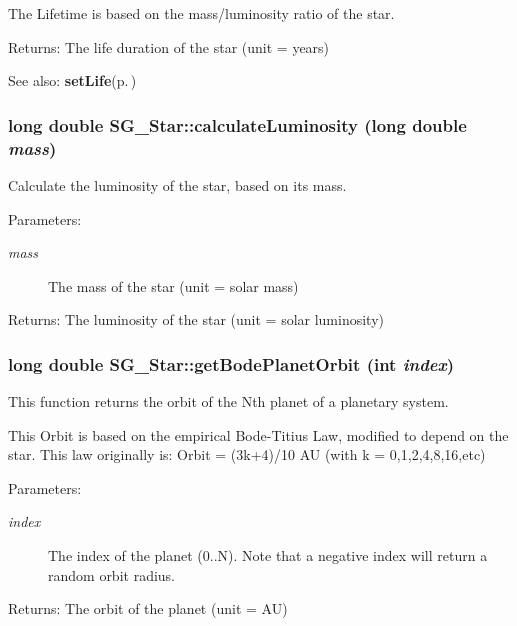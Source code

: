 The Lifetime is based on the mass/luminosity ratio of the star. \begin{Desc}
\item[Returns:]The life duration of the star (unit = years) \end{Desc}
\begin{Desc}
\item[See also:]{\bf set\-Life}{\rm (p.\,\pageref{class_s_g___star_a6})} \end{Desc}
\subsubsection{\setlength{\rightskip}{0pt plus 5cm}long double SG\_\-Star::calculate\-Luminosity (long double {\em mass})\hspace{0.3cm}{\tt  [protected]}}\label{class_s_g___star_b0}


Calculate the luminosity of the star, based on its mass. 

\begin{Desc}
\item[Parameters:]
\begin{description}
\item[{\em mass}]The mass of the star (unit = solar mass) \end{description}
\end{Desc}
\begin{Desc}
\item[Returns:]The luminosity of the star (unit = solar luminosity) \end{Desc}
\subsubsection{\setlength{\rightskip}{0pt plus 5cm}long double SG\_\-Star::get\-Bode\-Planet\-Orbit (int {\em index})}\label{class_s_g___star_a12}


This function returns the orbit of the Nth planet of a planetary system. 

This Orbit is based on the empirical Bode-Titius Law, modified to depend on the star. This law originally is: Orbit = (3k+4)/10 AU (with k = 0,1,2,4,8,16,etc) \begin{Desc}
\item[Parameters:]
\begin{description}
\item[{\em index}]The index of the planet (0..N). Note that a negative index will return a random orbit radius. \end{description}
\end{Desc}
\begin{Desc}
\item[Returns:]The orbit of the planet (unit = AU) \end{Desc}
